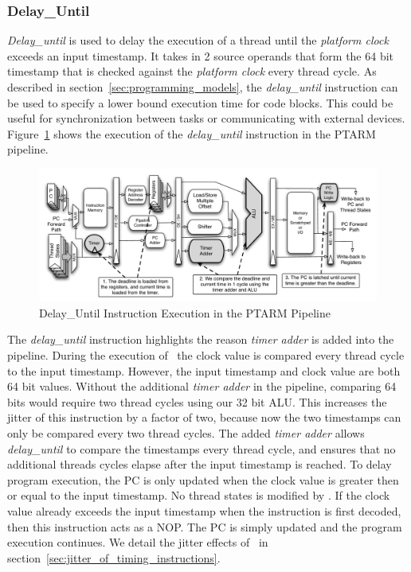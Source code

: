 \subsubsection{Delay\_Until}    
\emph{Delay\_until} is used to delay the execution of a thread until the \emph{platform clock} exceeds an input timestamp.
It takes in 2 source operands that form the 64 bit timestamp that is checked against the \emph{platform clock} every thread cycle.
As described in section~\ref{sec:programming_models}, the \emph{delay\_until} instruction can be used to specify a lower bound execution time for code blocks.
This could be useful for synchronization between tasks or communicating with external devices.
Figure~\ref{fig:delay_until_pipeline_implementation} shows the execution of the \emph{delay\_until} instruction in the PTARM pipeline.       
\begin{figure}[h]
  \begin{center}
    \includegraphics[scale=.54]{figs/delay_until_pipeline_implementation}
  \end{center}
  \vspace{-3mm}
  \caption{Delay\_Until Instruction Execution in the PTARM Pipeline}
  \label{fig:delay_until_pipeline_implementation}
\end{figure}

The \emph{delay\_until} instruction highlights the reason \emph{timer adder} is added into the pipeline.
During the execution of \delayuntil\, the clock value is compared every thread cycle to the input timestamp.
However, the input timestamp and clock value are both 64 bit values.
Without the additional \emph{timer adder} in the pipeline, comparing 64 bits would require two thread cycles using our 32 bit ALU. 
This increases the jitter of this instruction by a factor of two, because now the two timestamps can only be compared every two thread cycles. 
The added \emph{timer adder} allows \emph{delay\_until} to compare the timestamps every thread cycle, and ensures that no additional threads cycles elapse after the input timestamp is reached. 
To delay program execution, the PC is only updated when the clock value is greater then or equal to the input timestamp.
No thread states is modified by \delayuntil.
If the clock value already exceeds the input timestamp when the instruction is first decoded, then this instruction acts as a NOP. 
The PC is simply updated and the program execution continues.
We detail the jitter effects of \delayuntil\ in section~\ref{sec:jitter_of_timing_instructions}.

